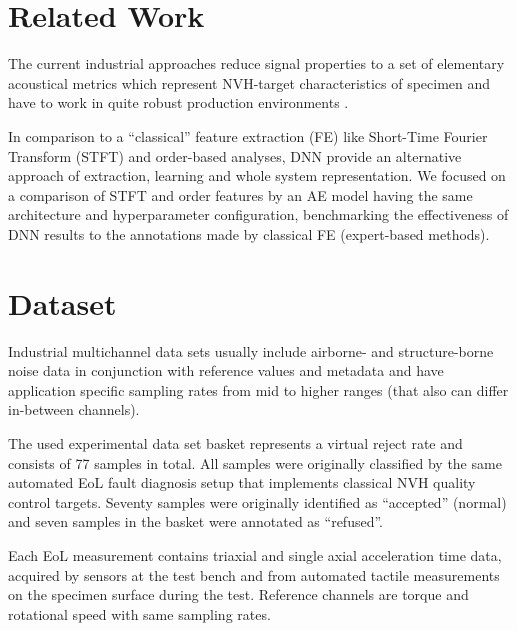 \documentclass[a4paper, 10pt, twocolumn]{article}
\begin{document}
\section*{Related Work}
\label{sec:Related Work}
The current industrial approaches reduce signal properties to a set of elementary acoustical metrics which represent NVH-target characteristics of specimen and have to work in quite robust production environments \cite{b4}. 
\par
In comparison to a “classical” feature extraction (FE) like Short-Time Fourier Transform (STFT) and order-based analyses, DNN provide an alternative approach of extraction, learning and whole system representation. We focused on a comparison of STFT and order features by an AE model having the same architecture and hyperparameter conﬁguration, benchmarking the effectiveness of DNN results to the annotations made by classical FE (expert-based methods). 


\section*{Dataset}
\label{sec:Dataset}
Industrial multichannel data sets usually include airborne- and structure-borne noise data in conjunction with reference values and metadata and have application specific sampling rates from mid to higher ranges (that also can differ in-between channels). 
\par
The used experimental data set basket represents a virtual reject rate and consists of 77 samples in total. All samples were originally classified by the same automated EoL fault diagnosis setup that implements classical NVH quality control targets. Seventy samples were originally identiﬁed as “accepted” (normal) and seven samples in the basket were annotated as “refused”.
\par
Each EoL measurement contains triaxial and single axial acceleration time data, acquired by sensors at the test bench and from automated tactile measurements on the specimen surface during the test. Reference channels are torque and rotational speed with same sampling rates.
\end{document}
